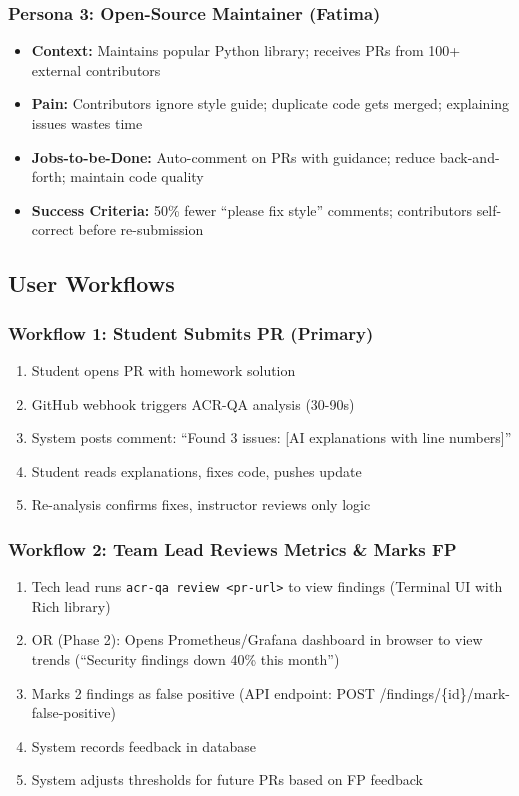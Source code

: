 \documentclass[11pt,a4paper]{article}
\begin{document}
\subsubsection{Persona 3: Open-Source Maintainer (Fatima)}
\begin{itemize}[leftmargin=*]
    \item \textbf{Context:} Maintains popular Python library; receives PRs from 100+ external contributors
    \item \textbf{Pain:} Contributors ignore style guide; duplicate code gets merged; explaining issues wastes time
    \item \textbf{Jobs-to-be-Done:} Auto-comment on PRs with guidance; reduce back-and-forth; maintain code quality
    \item \textbf{Success Criteria:} 50\% fewer ``please fix style'' comments; contributors self-correct before re-submission
\end{itemize}

\subsection{User Workflows}

\subsubsection{Workflow 1: Student Submits PR (Primary)}
\begin{enumerate}
    \item Student opens PR with homework solution
    \item GitHub webhook triggers ACR-QA analysis (30-90s)
    \item System posts comment: ``Found 3 issues: [AI explanations with line numbers]''
    \item Student reads explanations, fixes code, pushes update
    \item Re-analysis confirms fixes, instructor reviews only logic
\end{enumerate}

\subsubsection{Workflow 2: Team Lead Reviews Metrics \& Marks FP}
\begin{enumerate}
    \item Tech lead runs \texttt{acr-qa review <pr-url>} to view findings (Terminal UI with Rich library)
    \item OR (Phase 2): Opens Prometheus/Grafana dashboard in browser to view trends (``Security findings down 40\% this month'')
    \item Marks 2 findings as false positive (API endpoint: POST /findings/\{id\}/mark-false-positive)
    \item System records feedback in database
    \item System adjusts thresholds for future PRs based on FP feedback
\end{enumerate}
\end{document}

